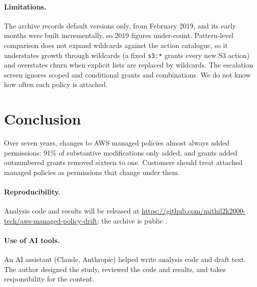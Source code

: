 \documentclass[11pt]{article}
\begin{document}
\paragraph{Limitations.} The archive records default versions only, from February 2019, and its early months were built incrementally,
so 2019 figures under-count. Pattern-level comparison does not expand wildcards against the action catalogue, so it understates growth
through wildcards (a fixed \texttt{s3:*} grants every new S3 action) and overstates churn when explicit lists are replaced by wildcards.
The escalation screen ignores scoped and conditional grants and combinations. We do not know how often each policy is attached.

\section{Conclusion}
Over seven years, changes to AWS managed policies almost always added permissions: 91\% of substantive modifications only added, and
grants added outnumbered grants removed sixteen to one. Customers should treat attached managed policies as permissions that change
under them.

\paragraph{Reproducibility.} Analysis code and results will be released at
\newline\url{https://github.com/mithil2k2000-tech/aws-managed-policy-drift}; the archive is public \cite{mamip}.

\paragraph{Use of AI tools.} An AI assistant (Claude, Anthropic) helped write analysis code and draft text. The author designed the
study, reviewed the code and results, and takes responsibility for the content.



\end{document}
